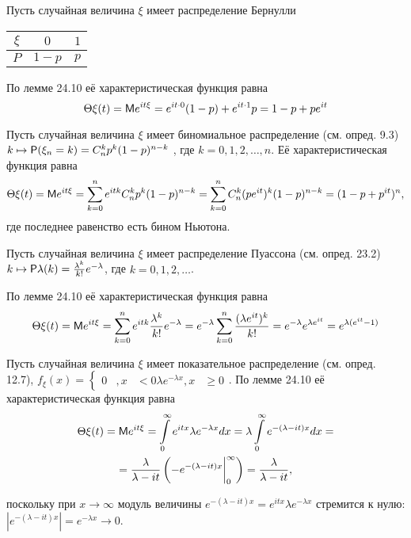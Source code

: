 \begin{example}
Пусть случайная величина $\xi$ имеет распределение Бернулли
\begin{center}
\begin{tabular}{|c|c|c|}
\hline
$\xi$ & $0$ & $1$\\ \hline
$P$ & $1-p$ & $p$\\ \hline
\end{tabular}	
\end{center}
По лемме 24.10 её характеристическая функция равна
$$\Theta\xi (t)=\M e^{it\xi}=e^{it\cdot0}(1-p)+e^{it\cdot1}p=1-p+pe^{it}$$
\end{example}

\begin{example}
Пусть случайная величина $\xi$ имеет биномиальное распределение (см. опред. 9.3) $k \mapsto \P(\xi_n=k)=C_n^k p^k (1-p)^{n-k}$ , где 
$k=0, 1, 2, \ldots , n$. Её характеристическая функция равна
%
%
$$\Theta\xi (t)=\M e^{it\xi}=
\sum\limits_{k=0}^n e^{itk} C_n^k p^k (1-p)^{n-k}=
\sum\limits_{k=0}^n C_n^k (pe^{it})^k (1-p)^{n-k}=(1-p+p^{it})^n,
$$
где последнее равенство есть бином Ньютона.
\end{example}


\begin{example}
Пусть случайная величина $\xi$ имеет распределение Пуассона (см. опред. 23.2) $k \mapsto \P\lambda (k)=\frac{\lambda^k}{k!}e^{-\lambda}$, где $k=0, 1, 2, \ldots$. 

По лемме 24.10 её характеристическая функция равна
%
%
$$\Theta\xi (t)=\M e^{it\xi}=
\sum\limits_{k=0}^n e^{itk} \frac{\lambda^k}{k!}e^{-\lambda}=
e^{-\lambda}\sum\limits_{k=0}^n \frac{(\lambda e^{it})^k}{k!}=
e^{-\lambda}e^{\lambda e^{it}}=
e^{\lambda(e^{it}-1)}
$$
\end{example}

\begin{example}
Пусть случайная величина $\xi$ имеет показательное распределение (см. опред. 12.7), 
%
$f_\xi(x)=\left\{
\begin{aligned}
	0&, x&<0
	\lambda e^{-\lambda x}, x&\geq0
\end{aligned}
\right.$.
%
По лемме 24.10 её характеристическая функция равна
%
%
\begin{gather*}
\Theta\xi (t)=\M e^{it\xi}=
\int\limits_0^\infty e^{itx}\lambda e^{-\lambda x} dx=
\lambda\int\limits_0^\infty e^{-(\lambda-it)x} dx=\\=
\frac{\lambda}{\lambda-it}
\left(
	-e^{-(\lambda-it)x}\bigg|_0^\infty
\right)=\frac{\lambda}{\lambda-it},
\end{gather*}


поскольку при $x \to \infty$ модуль величины $e^{-(\lambda-it)x}=e^{itx}\lambda e^{-\lambda x}$ стремится к
нулю: $|e^{-(\lambda-it)x}|=e^{-\lambda x}\to0$.
\end{example}

